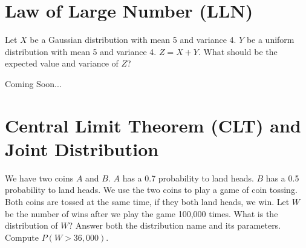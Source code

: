 \documentclass[a4paper, 10pt]{article}
\begin{document}
\subject[2110205 - Statistics for Computer Engineering]


\section{Law of Large Number (LLN)}



\begin{problem}
Let \( X \) be a Gaussian distribution with mean 5 and variance 4.
\( Y \) be a uniform distribution with mean 5 and variance 4.
\( Z = X + Y \). What should be the expected value and variance of \( Z \)?
\end{problem}

\begin{solution}
Coming Soon...
\end{solution}



\section{Central Limit Theorem (CLT) and Joint Distribution}



\begin{problem}[8]
We have two coins \( A \) and \( B \).
\( A \) has a 0.7 probability to land heads.
\( B \) has a 0.5 probability to land heads.
We use the two coins to play a game of coin tossing.
Both coins are tossed at the same time, if they both land heads, we win.
Let \( W \) be the number of wins after we play the game 100,000 times.
What is the distribution of \( W \)? Answer both the distribution name and its parameters.
Compute \( P(W > 36, 000) \).
\end{problem}
\end{document}
